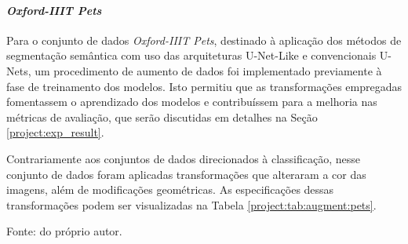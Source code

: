 \paragraph{\textit{Oxford-IIIT Pets}}
\label{project:augment:pets}
Para o conjunto de dados \textit{Oxford-IIIT Pets}, destinado à aplicação dos métodos de segmentação semântica com uso das arquiteturas U-Net-Like e convencionais U-Nets, um procedimento de aumento de dados foi implementado previamente à fase de treinamento dos modelos. Isto permitiu que as transformações empregadas fomentassem o aprendizado dos modelos e contribuíssem para a melhoria nas métricas de avaliação, que serão discutidas em detalhes na Seção \ref{project:exp_result}.

Contrariamente aos conjuntos de dados direcionados à classificação, nesse conjunto de dados foram aplicadas transformações que alteraram a cor das imagens, além de modificações geométricas. As especificações dessas transformações podem ser visualizadas na Tabela \ref{project:tab:augment:pets}.

\begin{table}[H]
    \centering
    \caption{Transformações executadas no conjunto de dados \textit{Oxford-IIIT Pets}.}
    \label{project:tab:augment:pets}

    \vspace*{1 cm}
    Fonte: do próprio autor.
\end{table}

